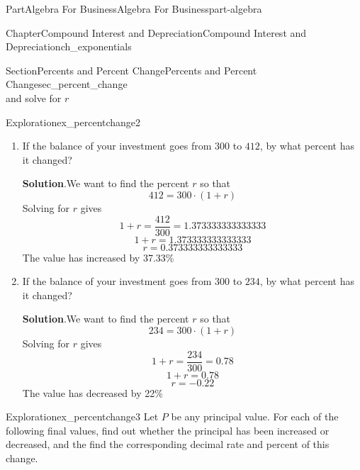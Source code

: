 \documentclass{tufte-book}
\newcommand{\blocktitlefont}{\relax}
\numberwithin{equation}{chapter}
\begin{document}
\begin{partptx}{Part}{Algebra For Business}{}{Algebra For Business}{}{}{part-algebra}
\begin{chapterptx}{Chapter}{Compound Interest and Depreciation}{}{Compound Interest and Depreciation}{}{}{ch_exponentials}
\begin{sectionptx}{Section}{Percents and Percent Change}{}{Percents and Percent Change}{}{}{sec_percent_change}
\begin{equation*}
\end{equation*}
and solve for \(r\)%
\begin{exploration}{Exploration}{}{ex_percentchange2}%
\begin{enumerate}[font=\bfseries,label=(\alph*),ref=\alph*]%
\item{}If the balance of your investment goes from \textdollar{}\(300\) to \textdollar{}\(412\), by what percent has it changed?%
\par\smallskip%
\noindent\textbf{\blocktitlefont Solution}.\hypertarget{ex_percentchange2-1-2}{}\quad{}We want to find the percent \(r\) so that%
\begin{equation*}
412 = 300\cdot (1 + r) 
\end{equation*}
Solving for \(r\) gives%
\begin{equation*}
1 + r = \frac{412}{300}  = 1.373333333333333 
\end{equation*}
%
\begin{equation*}
1 + r = 1.373333333333333 
\end{equation*}
%
\begin{equation*}
r = 0.373333333333333
\end{equation*}
The value has increased by 37.33\%%
\item{}If the balance of your investment goes from \textdollar{}\(300\) to \textdollar{}\(234\), by what percent has it changed?%
\par\smallskip%
\noindent\textbf{\blocktitlefont Solution}.\hypertarget{ex_percentchange2-2-2}{}\quad{}We want to find the percent \(r\) so that%
\begin{equation*}
234 = 300\cdot (1 + r) 
\end{equation*}
Solving for \(r\) gives%
\begin{equation*}
1 + r = \frac{234}{300}  = 0.78 
\end{equation*}
%
\begin{equation*}
1 + r = 0.78 
\end{equation*}
%
\begin{equation*}
r = -0.22
\end{equation*}
The value has decreased by 22\%%
\end{enumerate}%
\end{exploration}%
\begin{exploration}{Exploration}{}{ex_percentchange3}%
Let \(P\) be any principal value. For each of the following final values, find out whether the principal has been increased or decreased, and the find the corresponding decimal rate and percent of this change.%

\end{exploration}
\end{sectionptx}
\end{chapterptx}
\end{partptx}
\end{document}
